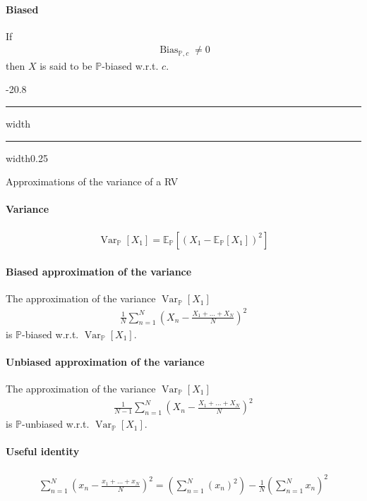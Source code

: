 \documentclass[a4paper,landscape,7pt,fleqn]{scrartcl}
\makeatletter
\renewcommand{\subsection}{\@startsection{subsection}{1}{0mm}%
{-2\baselineskip}{0.8\baselineskip}%
{\hrule depth 0.2pt width\columnwidth\hrule depth0.75pt
width0.25\columnwidth\vspace*{1.2em}\large\bfseries}}
\DeclareMathOperator{\Var}{Var}				%
\DeclareMathOperator{\Bias}{Bias}				%
\makeatother
\begin{document}
\begin{multicols*}{3}
\paragraph{Biased}

If
\begin{align*}
\Bias_{\mathbb{P},c} \neq 0
\end{align*}
then $X$ is said to be $\mathbb{P}$-biased w.r.t. $c$.

\subsection{Approximations of the variance of a RV}

\paragraph{Variance}

\begin{align*}
\Var_\mathbb{P}[X_1] = \mathbb{E}_\mathbb{P} \left[ (X_1 - \mathbb{E}_\mathbb{P}[X_1])^2 \right]
\end{align*}

\paragraph{Biased approximation of the variance}

The approximation of the variance $\Var_\mathbb{P}[X_1]$
\begin{align*}
\frac{1}{N} \sum_{n=1}^N \left( X_n - \frac{X_1 + \ldots + X_N}{N} \right)^2
\end{align*}
is $\mathbb{P}$-biased w.r.t. $\Var_\mathbb{P}[X_1]$.

\paragraph{Unbiased approximation of the variance}

The approximation of the variance $\Var_\mathbb{P}[X_1]$
\begin{align*}
\frac{1}{N-1} \sum_{n=1}^N \left( X_n - \frac{X_1 + \ldots + X_N}{N} \right)^2
\end{align*}
is $\mathbb{P}$-unbiased w.r.t. $\Var_\mathbb{P}[X_1]$.

\paragraph{Useful identity}

\begin{align*}
\sum_{n=1}^N \left( x_n - \frac{x_1 + \ldots + x_N}{N} \right)^2 = \left( \sum_{n=1}^N (x_n)^2 \right) - \frac{1}{N} \left( \sum_{n=1}^N x_n \right)^2
\end{align*}


\end{multicols*}
\end{document}
